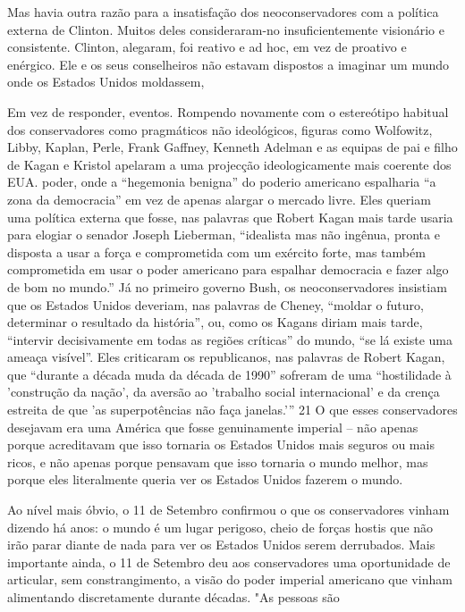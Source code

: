  \par 
Mas havia outra razão para a insatisfação dos neoconservadores com a política externa de Clinton. Muitos deles consideraram-no insuficientemente visionário e consistente. Clinton, alegaram, foi reativo e ad hoc, em vez de proativo e enérgico. Ele e os seus conselheiros não estavam dispostos a imaginar um mundo onde os Estados Unidos moldassem,
 \par 
Em vez de responder, eventos. Rompendo novamente com o estereótipo habitual dos conservadores como pragmáticos não ideológicos, figuras como Wolfowitz, Libby, Kaplan, Perle, Frank Gaffney, Kenneth Adelman e as equipas de pai e filho de Kagan e Kristol apelaram a uma projecção ideologicamente mais coerente dos EUA. poder, onde a “hegemonia benigna” do poderio americano espalharia “a zona da democracia” em vez de apenas alargar o mercado livre. Eles queriam uma política externa que fosse, nas palavras que Robert Kagan mais tarde usaria para elogiar o senador Joseph Lieberman, “idealista mas não ingênua, pronta e disposta a usar a força e comprometida com um exército forte, mas também comprometida em usar o poder americano para espalhar democracia e fazer algo de bom no mundo.” Já no primeiro governo Bush, os neoconservadores insistiam que os Estados Unidos deveriam, nas palavras de Cheney, “moldar o futuro, determinar o resultado da história”, ou, como os Kagans diriam mais tarde, “intervir decisivamente em todas as regiões críticas” do mundo, “se lá existe uma ameaça visível”. Eles criticaram os republicanos, nas palavras de Robert Kagan, que “durante a década muda da década de 1990” sofreram de uma “hostilidade à 'construção da nação', da aversão ao 'trabalho social internacional' e da crença estreita de que 'as superpotências não faça janelas.'” {\color{blue}21} O que esses conservadores desejavam era uma América que fosse genuinamente imperial – não apenas porque acreditavam que isso tornaria os Estados Unidos mais seguros ou mais ricos, e não apenas porque pensavam que isso tornaria o mundo melhor, mas porque eles literalmente queria ver os Estados Unidos fazerem o mundo.
 \par 
Ao nível mais óbvio, o {\color{blue}11} de Setembro confirmou o que os conservadores vinham dizendo há anos: o mundo é um lugar perigoso, cheio de forças hostis que não irão parar diante de nada para ver os Estados Unidos serem derrubados. Mais importante ainda, o {\color{blue}11} de Setembro deu aos conservadores uma oportunidade de articular, sem constrangimento, a visão do poder imperial americano que vinham alimentando discretamente durante décadas. "As pessoas são
